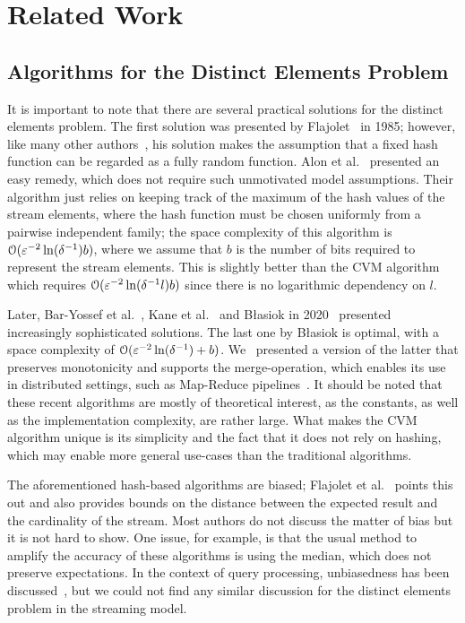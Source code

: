 \section{Related Work}\label{sec:related_work}
\subsection{Algorithms for the Distinct Elements Problem}
It is important to note that there are several practical solutions for the distinct elements problem.
The first solution was presented by Flajolet~\cite{flajolet1985} in 1985; however, like many other authors~\cite{flajolet2007,heule2013,pettie2021}, his solution makes the assumption that a fixed hash function can be regarded as a fully random function.
Alon et al.~\cite[Section 2.3]{alon1999} presented an easy remedy, which does not require such unmotivated model assumptions.
Their algorithm just relies on keeping track of the maximum of the hash values of the stream elements, where the hash function must be chosen uniformly from a pairwise independent family; the space complexity of this algorithm is $\operatorname{\mathcal O}(\varepsilon^{-2} \ln (\delta^{-1}) b)$, where we assume that $b$ is the number of bits required to represent the stream elements.
This is slightly better than the CVM algorithm which requires $\operatorname{\mathcal O}(\varepsilon^{-2} \ln (\delta^{-1}l) b)$ since there is no logarithmic dependency on $l$.

Later, Bar-Yossef et al.~\cite{baryossef2002}, Kane et al.~\cite{kane2010} and B\l{}asiok in 2020~\cite{blasiok2020} presented increasingly sophisticated solutions.
The last one by B\l{}asiok is optimal, with a space complexity of $\operatorname{\mathcal O}(\varepsilon^{-2} \ln (\delta^{-1}) + b)$.
We~\cite{karayel2023} presented a version of the latter that preserves monotonicity and supports the merge-operation, which enables its use in distributed settings, such as Map-Reduce pipelines~\cite{dean2010}.
It should be noted that these recent algorithms are mostly of theoretical interest, as the constants, as well as the implementation complexity, are rather large.
What makes the CVM algorithm unique is its simplicity and the fact that it does not rely on hashing, which may enable more general use-cases than the traditional algorithms.

The aforementioned hash-based algorithms are biased; Flajolet et al.~\cite{flajolet1985} points this out and also provides bounds on the distance between the expected result and the cardinality of the stream.
Most authors do not discuss the matter of bias but it is not hard to show.
One issue, for example, is that the usual method to amplify the accuracy of these algorithms is using the median, which does not preserve expectations.
In the context of query processing, unbiasedness has been discussed~\cite[Section 2.1]{haas1995}, but we could not find any similar discussion for the distinct elements problem in the streaming model.

